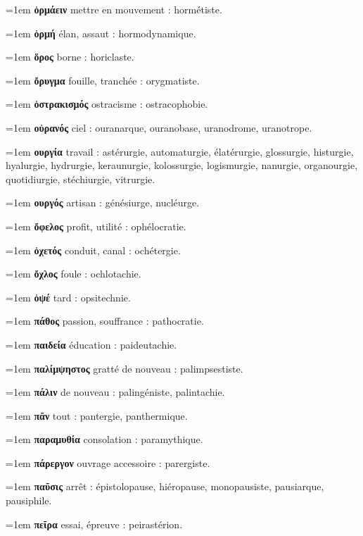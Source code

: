 \hangindent=1em \textbf{ὁρμάειν} mettre en mouvement : hormétiste.\par
\hangindent=1em \textbf{ὁρμή} élan, assaut : hormodynamique.\par
\hangindent=1em \textbf{ὅρος} borne : horiclaste.\par
\hangindent=1em \textbf{ὄρυγμα} fouille, tranchée : orygmatiste.\par
\hangindent=1em \textbf{ὀστρακισμός} ostracisme : ostracophobie.\par
\hangindent=1em \textbf{οὐρανός} ciel : ouranarque, ouranobase, uranodrome, uranotrope.\par
\hangindent=1em \textbf{ουργία} travail : astérurgie, automaturgie, élatérurgie, glossurgie, histurgie, hyalurgie, hydrurgie, keraunurgie, kolossurgie, logismurgie, nanurgie, organourgie, quotidiurgie, stéchiurgie, vitrurgie.\par
\hangindent=1em \textbf{ουργός} artisan : génésiurge, nucléurge.\par
\hangindent=1em \textbf{ὄφελος} profit, utilité : ophélocratie.\par
\hangindent=1em \textbf{ὀχετός} conduit, canal : ochétergie.\par
\hangindent=1em \textbf{ὄχλος} foule : ochlotachie.\par
\hangindent=1em \textbf{ὀψέ} tard : opsitechnie.\par
\hangindent=1em \textbf{πάθος} passion, souffrance : pathocratie.\par
\hangindent=1em \textbf{παιδεία} éducation : paideutachie.\par
\hangindent=1em \textbf{παλίμψηστος} gratté de nouveau : palimpsestiste.\par
\hangindent=1em \textbf{πάλιν} de nouveau : palingéniste, palintachie.\par
\hangindent=1em \textbf{πᾶν} tout : pantergie, panthermique.\par
\hangindent=1em \textbf{παραμυθία} consolation : paramythique.\par
\hangindent=1em \textbf{πάρεργον} ouvrage accessoire : parergiste.\par
\hangindent=1em \textbf{παῦσις} arrêt : épistolopause, hiéropause, monopausiste, pausiarque, pausiphile.\par
\hangindent=1em \textbf{πεῖρα} essai, épreuve : peirastérion.\par
